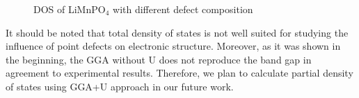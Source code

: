 \begin{figure}[h!]
\begin{minipage}[h]{0.5\linewidth}
\end{minipage}
\hfill
\begin{minipage}[ht]{0.5\linewidth}
\end{minipage}
\caption{DOS of LiMnPO$_4$ with different defect composition }
\label{ris:1-4DOS_LMP}
\end{figure}

It should be noted that total density of states is not well suited for studying the influence of point defects on electronic structure. Moreover, as it was shown in the beginning, the GGA without U does not reproduce the band gap in agreement to experimental results. Therefore, we plan to calculate partial density of states using GGA+U approach in our future work.


